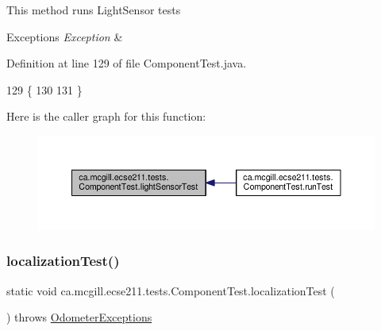 This method runs Light\+Sensor tests


\begin{DoxyExceptions}{Exceptions}
{\em Exception} & \\
\hline
\end{DoxyExceptions}


Definition at line 129 of file Component\+Test.\+java.


\begin{DoxyCode}
129                                        \{
130 
131   \}
\end{DoxyCode}
Here is the caller graph for this function\+:\nopagebreak
\begin{figure}[H]
\begin{center}
\leavevmode
\includegraphics[width=350pt]{enumca_1_1mcgill_1_1ecse211_1_1tests_1_1_component_test_a3e8288f482b3806a0f3c4668951f3e36_icgraph}
\end{center}
\end{figure}
\mbox{\label{enumca_1_1mcgill_1_1ecse211_1_1tests_1_1_component_test_ad11712dd74c5c64e84cd71186a59a087}} 
\subsubsection{\texorpdfstring{localization\+Test()}{localizationTest()}}
{\footnotesize\ttfamily static void ca.\+mcgill.\+ecse211.\+tests.\+Component\+Test.\+localization\+Test (\begin{DoxyParamCaption}{ }\end{DoxyParamCaption}) throws \hyperlink{classca_1_1mcgill_1_1ecse211_1_1odometer_1_1_odometer_exceptions}{Odometer\+Exceptions}\hspace{0.3cm}{\ttfamily [static]}}

